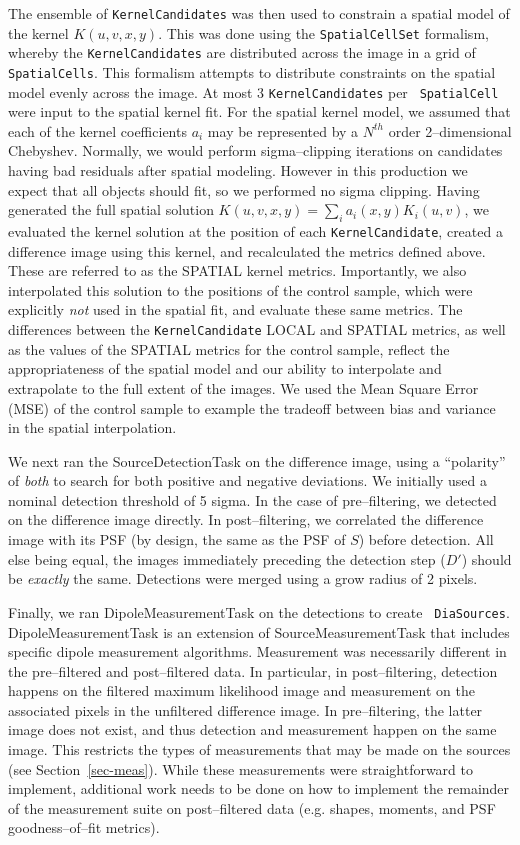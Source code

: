 \documentclass[prd, nofootinbib, floatfix, 11pt,tightenlines,times]{article}
\begin{document}
The ensemble of {\tt KernelCandidates} was then used to constrain a
spatial model of the kernel $K(u,v,x,y)$.  This was done using the
{\tt SpatialCellSet} formalism, whereby the {\tt KernelCandidates} are
distributed across the image in a grid of {\tt SpatialCells}.  This
formalism attempts to distribute constraints on the spatial model
evenly across the image.  At most 3 {\tt KernelCandidates} per {\tt
  SpatialCell} were input to the spatial kernel fit.  For the spatial
kernel model, we assumed that each of the kernel coefficients $a_i$
may be represented by a $N^{th}$ order 2--dimensional Chebyshev.
Normally, we would perform sigma--clipping iterations on candidates
having bad residuals after spatial modeling.  However in this
production we expect that all objects should fit, so we performed no
sigma clipping.  Having generated the full spatial solution
$K(u,v,x,y) = \sum_i a_i(x,y) K_i(u,v)$, we evaluated the kernel
solution at the position of each {\tt KernelCandidate}, created a
difference image using this kernel, and recalculated the metrics
defined above.  These are referred to as the SPATIAL kernel metrics.
Importantly, we also interpolated this solution to the positions of
the control sample, which were explicitly {\it not} used in the
spatial fit, and evaluate these same metrics.  The differences between
the {\tt KernelCandidate} LOCAL and SPATIAL metrics, as well as the
values of the SPATIAL metrics for the control sample, reflect the
appropriateness of the spatial model and our ability to interpolate
and extrapolate to the full extent of the images.  We used the Mean
Square Error (MSE) of the control sample to example the tradeoff
between bias and variance in the spatial interpolation.

We next ran the SourceDetectionTask on the difference image, using a
``polarity'' of {\it both} to search for both positive and negative
deviations.  We initially used a nominal detection threshold of 5
sigma.  In the case of pre--filtering, we detected on the difference
image directly.  In post--filtering, we correlated the difference
image with its PSF (by design, the same as the PSF of $S$) before
detection.  All else being equal, the images immediately preceding the
detection step ($D'$) should be {\it exactly} the same.  Detections
were merged using a grow radius of 2 pixels.

Finally, we ran DipoleMeasurementTask on the detections to create {\tt
  DiaSources}.  DipoleMeasurementTask is an extension of
SourceMeasurementTask that includes specific dipole measurement
algorithms.  Measurement was necessarily different in the
pre--filtered and post--filtered data.  In particular, in
post--filtering, detection happens on the filtered maximum likelihood
image and measurement on the associated pixels in the unfiltered
difference image.  In pre--filtering, the latter image does not exist,
and thus detection and measurement happen on the same image.  This
restricts the types of measurements that may be made on the sources
(see Section~\ref{sec-meas}).  While these measurements were
straightforward to implement, additional work needs to be done on how
to implement the remainder of the measurement suite on post--filtered
data (e.g. shapes, moments, and PSF goodness--of--fit metrics).
\end{document}
